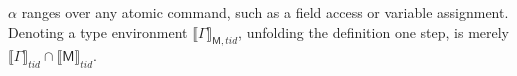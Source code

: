 $\alpha$ ranges over any atomic command, such as a field access or variable assignment.
Denoting a type environment $\llbracket\Gamma\rrbracket_{\mathsf{M},tid}$, unfolding the definition one step, is merely $\llbracket\Gamma\rrbracket_{tid}\cap\llbracket\mathsf{M}\rrbracket_{tid}$.
